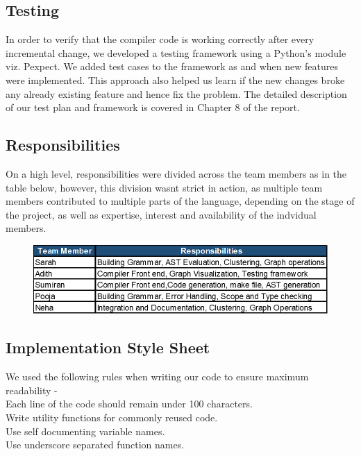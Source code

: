 \documentclass[a4paper]{article}
\begin{document}
\subsection{Testing}
In order to verify that the compiler code is working correctly after every incremental change, we developed a testing framework using a Python’s module viz. Pexpect. We added test cases to the framework as and when new features were implemented. This approach also helped us learn if the new changes broke any already existing feature and hence fix the problem. The detailed description of our test plan and framework is covered in Chapter 8 of the report.

\subsection{Responsibilities}
On a high level, responsibilities were divided across the team members as in the table below, however, this division wasnt strict in action, as multiple team members contributed to multiple parts of the language, depending on the stage of the project, as well as expertise, interest and availability of the indvidual members.\\
\begin{figure}[h]
\centering
\includegraphics[width=1.0\textwidth]{graphene.png}
\end{figure}


\subsection{Implementation Style Sheet}
We used the following rules when writing our code to ensure maximum readability -\\
\hspace{.4cm}Each line of the code should remain under 100 characters.\\
\hspace{.4cm}Write utility functions for commonly reused code.\\
\hspace{.4cm}Use self documenting variable names.\\
\hspace{.4cm}Use underscore separated function names.\\
\end{document}
